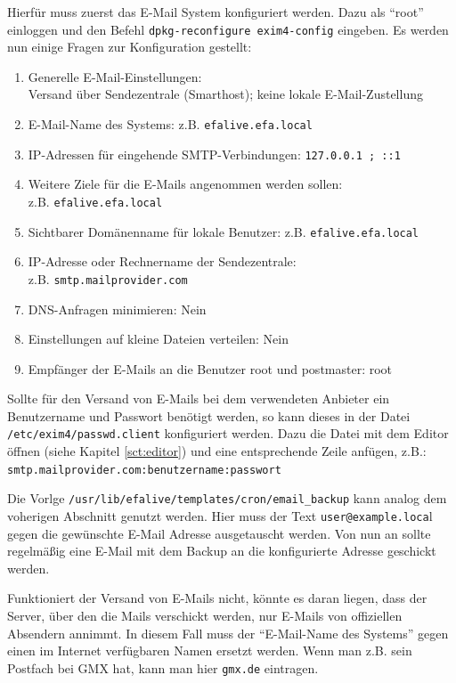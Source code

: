 \documentclass[a4paper,12pt,twoside]{article}
\begin{document}
Hierfür muss zuerst das E-Mail System konfiguriert werden. Dazu als
"`root"' einloggen und den Befehl
\texttt{dpkg-reconfigure exim4-config} eingeben.
Es werden nun einige Fragen zur Konfiguration gestellt:

\begin{enumerate}
    \item Generelle E-Mail-Einstellungen: \\
        Versand über Sendezentrale (Smarthost); keine lokale E-Mail-Zustellung
    \item E-Mail-Name des Systems: z.B. \texttt{efalive.efa.local}
    \item IP-Adressen für eingehende SMTP-Verbindungen: \texttt{127.0.0.1 ; ::1}
    \item Weitere Ziele für die E-Mails angenommen werden sollen: \\
        z.B. \texttt{efalive.efa.local}
    \item Sichtbarer Domänenname für lokale Benutzer: z.B. \texttt{efalive.efa.local}
    \item IP-Adresse oder Rechnername der Sendezentrale: \\
        z.B. \texttt{smtp.mailprovider.com}
    \item DNS-Anfragen minimieren: Nein
    \item Einstellungen auf kleine Dateien verteilen: Nein
    \item Empfänger der E-Mails an die Benutzer root und postmaster: root
\end{enumerate}

Sollte für den Versand von E-Mails bei dem verwendeten Anbieter ein
Benutzername und Passwort benötigt werden, so kann dieses in der Datei
\linebreak[4]\texttt{/etc/exim4/passwd.client} konfiguriert werden. Dazu die Datei mit dem
Editor öffnen (siehe Kapitel \ref{sct:editor}) und
eine entsprechende Zeile anfügen, z.B.:
\bigskip
\\
\texttt{smtp.mailprovider.com:benutzername:passwort}

\bigskip
Die Vorlge \texttt{/usr/lib/efalive/templates/cron/email\_backup} kann analog 
\linebreak[4]dem voherigen Abschnitt genutzt werden. Hier muss der Text
\texttt{user@example.loca}l gegen die gewünschte E-Mail Adresse ausgetauscht
werden. Von nun an sollte regelmäßig eine E-Mail mit dem Backup an die
konfigurierte Adresse geschickt werden.

Funktioniert der Versand von E-Mails nicht, könnte es daran liegen, dass
der Server, über den die Mails verschickt werden, nur E-Mails von
offiziellen Absendern annimmt. In diesem Fall muss der
"`E-Mail-Name des Systems"' gegen einen im
Internet verfügbaren Namen ersetzt werden. Wenn man z.B. sein Postfach
bei GMX hat, kann man hier \texttt{gmx.de} eintragen.
\end{document}
